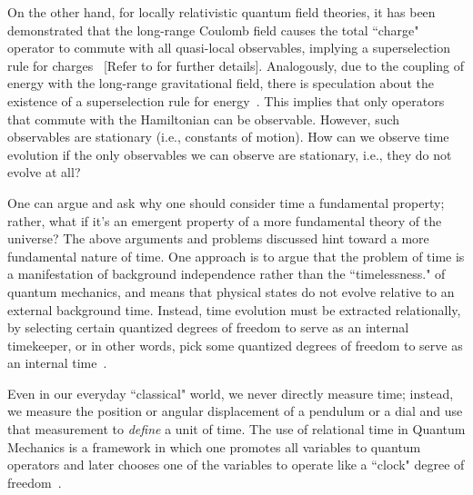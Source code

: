 On the other hand, for locally relativistic quantum field theories, it has been demonstrated that the 
long-range Coulomb field causes the total ``charge" operator to commute with all quasi-local observables, 
implying a superselection rule for charges~\cite{Strocchi:1974xh} [Refer to  
for further details]. Analogously, due to the coupling of energy with the long-range gravitational 
field, there is speculation about the existence of a superselection rule for energy~\cite{page1983evolution}. 
This implies that only operators that commute with the Hamiltonian can be observable. However, such 
observables are stationary (i.e., constants of motion). How can we observe time evolution if the 
only observables we can observe are stationary, i.e., they do not evolve at all?

One can argue and ask why one should consider time a fundamental property; rather, what if 
it's an emergent property of a more fundamental theory of the universe? The above arguments and 
problems discussed hint toward a more fundamental nature of time. One approach is to argue that 
the problem of time is a manifestation of background independence rather than the ``timelessness." 
of quantum mechanics, and means that physical states do not evolve relative to an external background 
time. Instead, time evolution must be extracted relationally, by selecting certain quantized degrees 
of freedom to serve as an internal timekeeper, or in other words, pick some quantized degrees of freedom to serve 
as an internal time~\cite{hohn2021trinity}.

Even in our everyday ``classical" world, we never directly measure time; instead, we measure the 
position or angular displacement of a pendulum or a dial and use that measurement to \emph{define} a 
unit of time. The use of relational time in Quantum Mechanics is a framework in which one promotes 
all variables to quantum operators and later chooses one of the variables to operate like a    
``clock" degree of freedom~\cite{gambini2006relational}.

